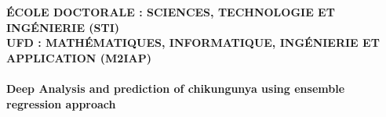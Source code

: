 \begin{titlepage}
\begin{center}
\textsc{\Large \textbf{ÉCOLE DOCTORALE : SCIENCES, TECHNOLOGIE ET INGÉNIERIE (STI)}}\\[0.1cm]
\textsc{\Large \textbf{UFD : MATHÉMATIQUES, INFORMATIQUE, INGÉNIERIE ET APPLICATION (M2IAP)}}\\[0.8cm]







\HRule \\[0.2cm]

{\huge \bfseries Deep Analysis and prediction of chikungunya using ensemble regression approach  \\[0.2cm] }

\HRule \\[1cm]


\end{center}
\end{titlepage}
